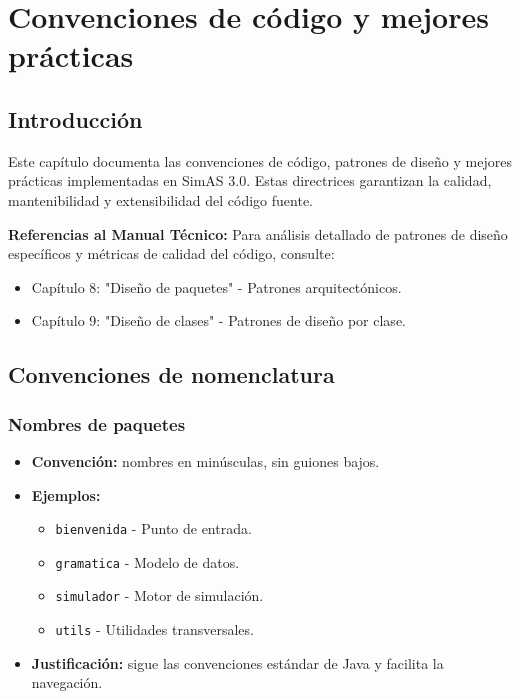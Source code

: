 \chapter{Convenciones de código y mejores prácticas}\label{cap-convenciones-practicas}

\section{Introducción}

Este capítulo documenta las convenciones de código, patrones de diseño y mejores prácticas implementadas en SimAS 3.0. Estas directrices garantizan la calidad, mantenibilidad y extensibilidad del código fuente.

\textbf{Referencias al Manual Técnico:} Para análisis detallado de patrones de diseño específicos y métricas de calidad del código, consulte:
\begin{itemize}
    \item Capítulo 8: "Diseño de paquetes" - Patrones arquitectónicos.
    \item Capítulo 9: "Diseño de clases" - Patrones de diseño por clase.
\end{itemize}

\section{Convenciones de nomenclatura}

\subsection{Nombres de paquetes}

\begin{itemize}
    \item \textbf{Convención:} nombres en minúsculas, sin guiones bajos.
    \item \textbf{Ejemplos:}
    \begin{itemize}
        \item \texttt{bienvenida} - Punto de entrada.
        \item \texttt{gramatica} - Modelo de datos.
        \item \texttt{simulador} - Motor de simulación.
        \item \texttt{utils} - Utilidades transversales.
    \end{itemize}
    \item \textbf{Justificación:} sigue las convenciones estándar de Java y facilita la navegación.
\end{itemize}

